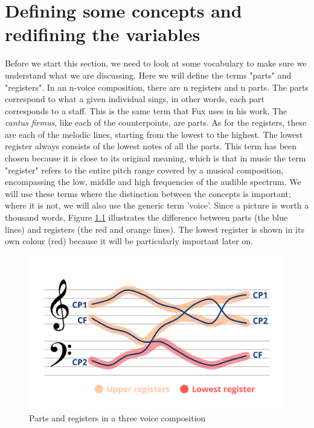 \chapter{Defining some concepts and redifining the variables} \label{section:bass}
Before we start this section, we need to look at some vocabulary to make sure we understand what we are discussing. Here we will define the terms "parts" and "registers". In an n-voice composition, there are n registers and n parts. The parts correspond to what a given individual sings, in other words, each part corresponds to a staff. This is the same term that Fux uses in his work. The \textit{cantus firmus}, like each of the counterpoints, are parts.
As for the registers, these are each of the melodic lines, starting from the lowest to the highest. The lowest register always consists of the lowest notes of all the parts. This term has been chosen because it is close to its original meaning, which is that in music the term "register" refers to the entire pitch range covered by a musical composition, encompassing the low, middle and high frequencies of the audible spectrum. 
We will use these terms where the distinction between the concepts is important; where it is not, we will also use the generic term 'voice'.
Since a picture is worth a thousand words, Figure \ref{fig:lowest} illustrates the difference between parts (the blue lines) and registers (the red and orange lines). The lowest register is shown in its own colour (red) because it will be particularly important later on.

\begin{figure}[ht]
  \centering
  \includegraphics[width=1\textwidth]{Images/lowest.png}
  \caption{Parts and registers in a three voice composition}
  \label{fig:lowest}
\end{figure}

